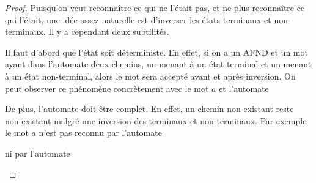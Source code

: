 \begin{proof}
Puisqu'on veut reconnaître ce qui ne l'était pas, et ne plus reconnaître ce qui l'était, une idée assez naturelle est d'inverser les états terminaux et non-terminaux. Il y a cependant deux subtilités.

Il faut d'abord que l'état soit déterministe. En effet, si on a un AFND et un mot ayant dans l'automate deux chemins, un menant à un état terminal et un menant à un état non-terminal, alors le mot sera accepté avant et après inversion. On peut observer ce phénomène concrètement avec le mot $a$ et l'automate  


\begin{figure}[H]
\centering
{}
\end{figure}

De plus, l'automate doit être complet. En effet, un chemin non-existant reste non-existant malgré une inversion des terminaux et non-terminaux. Par exemple le mot $a$ n'est pas reconnu par l'automate 

\begin{figure}[H]
\centering
{}
\end{figure}

ni par l'automate 


\begin{figure}[H]
\centering
{}
\end{figure}
\end{proof}
